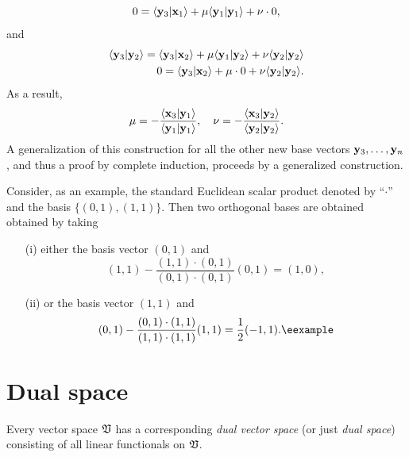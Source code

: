 {\begin{equation}
\begin{split}
\\
0
=
\langle {\bf y}_3\vert {\bf x}_1 \rangle + \mu  \langle {\bf y}_1\vert {\bf y}_1 \rangle  + \nu  \cdot 0 ,
\end{split}
\end{equation}
and
\begin{equation}
\begin{split}
\langle {\bf y}_3\vert {\bf y}_2\rangle =\langle {\bf y}_3\vert {\bf x}_2 \rangle + \mu  \langle {\bf y}_1\vert {\bf y}_2 \rangle  + \nu  \langle {\bf y}_2\vert {\bf y}_2\rangle
\\
0 =\langle {\bf y}_3\vert {\bf x}_2 \rangle + \mu   \cdot 0  + \nu  \langle {\bf y}_2\vert {\bf y}_2 \rangle  .
\end{split}
\end{equation}
As a result,
\begin{equation}
\mu = -  \frac{\langle {\bf x}_3\vert {\bf y}_1  \rangle}
{\langle {\bf y}_1\vert {\bf y}_1 \rangle},\quad
\nu =- \frac{\langle {\bf x}_3\vert {\bf y}_2  \rangle}
{\langle {\bf y}_2\vert {\bf y}_2 \rangle}.
\end{equation}
A generalization of this construction
for all the other new base vectors
${\bf y}_3, \ldots ,  {\bf y}_n$, and thus a proof by complete induction,
proceeds by a generalized construction.
\eproof
}

{\color{blue}
\bexample
Consider, as an example, the standard Euclidean scalar product denoted by ``$\cdot$''
and the basis
$\{(0,1),(1,1)\}$.
Then two orthogonal bases are obtained obtained by taking
\begin{itemize}
\item[(i)]
either the basis vector
$(0,1)$ and
$$
(1,1) -
\frac{(1,1)\cdot (0,1)}{(0,1)\cdot (0,1)} (0,1) = (1,0),
$$
\item[(ii)]
or the basis vector
$(1,1)$ and
$$
(0,1) -
\frac{(0,1)\cdot (1,1)}{(1,1)\cdot (1,1)} (1,1) = \frac{1}{2}(-1,1). \textrm{\eexample}
$$
\end{itemize}
}





\section{Dual space}
\label{2011-m-dvs}

Every vector space ${\frak V}$
has a corresponding {\em dual vector space}
(or just {\em dual space})
consisting of all linear functionals on ${\frak V}$.

